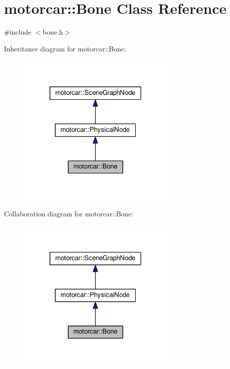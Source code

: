 \hypertarget{classmotorcar_1_1Bone}{\section{motorcar\-:\-:Bone Class Reference}
\label{classmotorcar_1_1Bone}
}


{\ttfamily \#include $<$bone.\-h$>$}



Inheritance diagram for motorcar\-:\-:Bone\-:
\nopagebreak
\begin{figure}[H]
\begin{center}
\leavevmode
\includegraphics[width=218pt]{classmotorcar_1_1Bone__inherit__graph}
\end{center}
\end{figure}


Collaboration diagram for motorcar\-:\-:Bone\-:
\nopagebreak
\begin{figure}[H]
\begin{center}
\leavevmode
\includegraphics[width=218pt]{classmotorcar_1_1Bone__coll__graph}
\end{center}
\end{figure}
